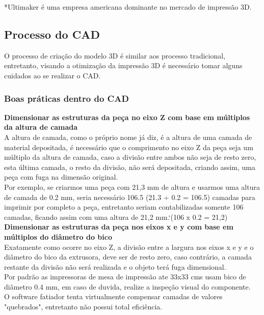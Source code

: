 *Ultimaker é uma empresa americana dominante no mercado de impressão 3D.
%
\subsection{Processo do CAD}
O processo de criação do modelo 3D é similar aos processo tradicional, entretanto, visando a otimização da impressão 3D é necessário tomar alguns cuidados ao se realizar o CAD.\\[0.3cm]

\subsubsection{Boas práticas dentro do CAD}

\textbf{Dimensionar as estruturas da peça no eixo Z com base em múltiplos da altura de camada}\\[0.3cm]

A altura de camada, como o próprio nome já diz, é a altura de uma camada de material depositada, é necessário que o comprimento no eixo Z da peça seja um múltiplo da altura de camada, caso a divisão entre ambos não seja de resto zero, esta última camada, o resto da divisão, não será depositada, criando assim, uma peça com fuga na dimensão original.\\[0.2cm]

Por exemplo, se criarmos uma peça com 21,3 mm de altura e usarmos uma altura de camada de 0.2 mm, seria necessário 106.5 (21.3 ÷ 0.2 = 106.5) camadas para imprimir por completo a peça, entretanto seriam contabilizadas somente 106 camadas, ficando assim com uma altura de 21,2 mm.`(106 x 0.2 = 21,2)\\[0.3cm]

\textbf{Dimensionar as estruturas da peça nos eixos x e y com base em múltiplos do diâmetro do bico}\\[0.2cm]



Exatamente como ocorre no eixo Z, a divisão entre a largura nos eixos x e y e o diâmetro do bico da extrusora, deve ser de resto zero, caso contrário, a camada restante da divisão não será realizada e o objeto terá fuga dimensional.\\[0.4cm]



\small {Por padrão as impressoras de mesa de impressão ate 33x33 cms usam bico de diâmetro 0.4 mm, em caso de duvida, realize a inspeção visual do componente.\\[0.2cm]



O software fatiador tenta virtualmente compensar camadas de valores "quebrados", entretanto não possui total eficiência}.\\[0.2cm]



